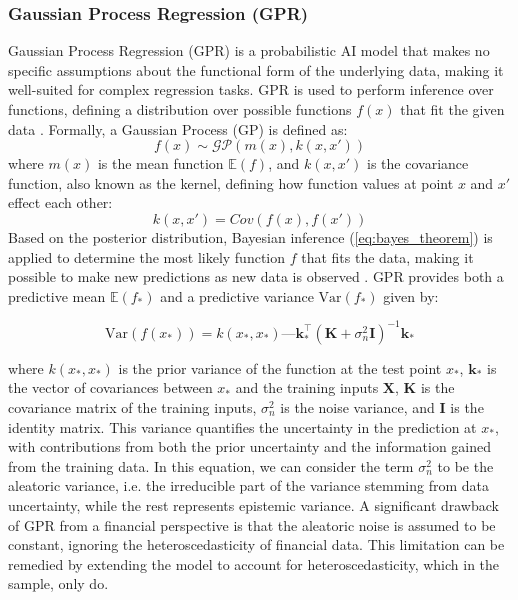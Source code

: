 \subsubsection{Gaussian Process Regression (GPR)}
Gaussian Process Regression (GPR) is a probabilistic AI model that makes no specific assumptions about the functional form of the underlying data, making it well-suited for complex regression tasks. GPR is used to perform inference over functions, defining a distribution over possible functions $f(x)$ that fit the given data \parencite{rasmussen_williams_2006}. Formally, a Gaussian Process (GP)  is defined as: 
\begin{equation}
f(x) \sim \mathcal{GP}(m(x), k(x, x'))
\end{equation}
where $m(x)$ is the mean function $\mathbb{E}(f)$, and $k(x, x')$ is the covariance function, also known as the kernel, defining how function values at point $x$ and $ x'$ effect each other:
\begin{equation}
k(x, x')=Cov(f(x),f(x'))
\end{equation}
Based on the posterior distribution, Bayesian inference (\ref{eq:bayes_theorem}) is applied to determine the most likely function $f$ that fits the data, making it possible to make new predictions as new data is observed \parencite{rasmussen_williams_2006}. GPR provides both a predictive mean \( \mathbb{E}(f_*) \) and a predictive variance \( \mathrm{Var}(f_*) \) given by:

\begin{equation}
\mathrm{Var}(f(x_*)) = k(x_*, x_*)—\mathbf{k}_*^\top (\mathbf{K} + \sigma_n^2 \mathbf{I})^{-1} \mathbf{k}_*
\end{equation}

where \( k(x_*, x_*) \) is the prior variance of the function at the test point \( x_* \), \( \mathbf{k}_* \) is the vector of covariances between \( x_* \) and the training inputs \( \mathbf{X} \), \( \mathbf{K} \) is the covariance matrix of the training inputs, \( \sigma_n^2 \) is the noise variance, and \( \mathbf{I} \) is the identity matrix. This variance quantifies the uncertainty in the prediction at \( x_* \), with contributions from both the prior uncertainty and the information gained from the training data. In this equation, we can consider the term $\sigma_n^2$ to be the aleatoric variance, i.e. the irreducible part of the variance stemming from data uncertainty, while the rest represents epistemic variance. A significant drawback of GPR from a financial perspective is that the aleatoric noise is assumed to be constant, ignoring the heteroscedasticity of financial data. This limitation can be remedied by extending the model to account for heteroscedasticity, which in the sample, only \textcite{Risk2018gpr, tegner2021probabilistic, Platanios2014gpr} do.

